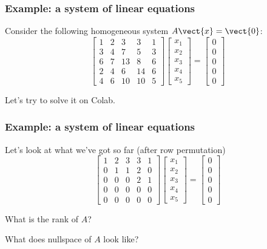 \begin{frame}
  \frametitle{Example: a system of linear equations}

  Consider the following homogeneous system $A\vect{x} = \vect{0}$:
  \[
  \begin{bmatrix}
    1 & 2 & 3 & 3 & 1 \\
    3 & 4 & 7 & 5 & 3 \\
    6 & 7 & 13 & 8 & 6 \\
    2 & 4 & 6 & 14 & 6 \\
    4 & 6 & 10 & 10 & 5 
  \end{bmatrix}
  \begin{bmatrix}
    x_1 \\ x_2 \\ x_3 \\ x_4 \\ x_5
  \end{bmatrix}
  =
  \begin{bmatrix}
    0 \\ 0 \\ 0 \\ 0 \\ 0
  \end{bmatrix}
  \]

  \pause
  Let's try to solve it on Colab.
\end{frame}

\begin{frame}
  \frametitle{Example: a system of linear equations}

  Let's look at what we've got so far (after row permutation)
  \[
  \begin{bmatrix}
    1 & 2 & 3 & 3 & 1 \\
    0 & 1 & 1 & 2 & 0 \\
    0 & 0 & 0 & 2 & 1 \\
    0 & 0 & 0 & 0 & 0 \\
    0 & 0 & 0 & 0 & 0 
  \end{bmatrix}
  \begin{bmatrix}
    x_1 \\ x_2 \\ x_3 \\ x_4 \\ x_5
  \end{bmatrix}
  =
  \begin{bmatrix}
    0 \\ 0 \\ 0 \\ 0 \\ 0
  \end{bmatrix}
  \]

  \pause
  What is the rank of $A$?

  \pause
  What does nullspace of $A$ look like?
\end{frame}

